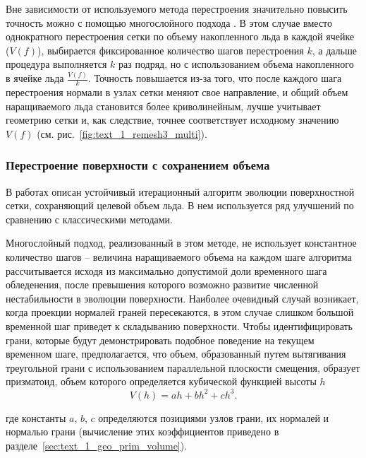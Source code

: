 Вне зависимости от используемого метода перестроения значительно повысить точность можно с помощью многослойного подхода \cite{BourgaultCote2017}.
В этом случае вместо однократного перестроения сетки по объему накопленного льда в каждой ячейке ($V(f)$), выбирается фиксированное количество шагов перестроения $k$, а дальше процедура выполняется $k$ раз подряд, но с использованием объема накопленного в ячейке льда $\frac{V(f)}{k}$.
Точность повышается из-за того, что после каждого шага перестроения нормали в узлах сетки меняют свое направление, и общий объем наращиваемого льда становится более криволинейным, лучше учитывает геометрию сетки и, как следствие, точнее соответствует исходному значению $V(f)$ (см. рис.~\ref{fig:text_1_remesh3_multi}).

\subsubsection{Перестроение поверхности с сохранением объема}

В работах \cite{Thompson2013Remesh,Tong2017Remesh} описан устойчивый итерационный алгоритм эволюции поверхностной сетки, сохраняющий целевой объем льда.
В нем используется ряд улучшений по сравнению с классическими методами.

Многослойный подход, реализованный в этом методе, не использует константное количество шагов -- величина наращиваемого объема на каждом шаге алгоритма рассчитывается исходя из максимально допустимой доли временного шага обледенения, после превышения которого возможно развитие численной нестабильности в эволюции поверхности.
Наиболее очевидный случай возникает, когда проекции нормалей граней пересекаются, в этом случае слишком большой временной шаг приведет к складыванию поверхности.
Чтобы идентифицировать грани, которые будут демонстрировать подобное поведение на текущем временном шаге, предполагается, что объем, образованный путем вытягивания треугольной грани с использованием параллельной плоскости смещения, образует призматоид, объем которого определяется кубической функцией высоты $h$
\begin{equation}\label{text_1_remesh_3d_tong1}
V(h)=ah+bh^2+ch^3.
\end{equation}

где константы $a$, $b$, $c$ определяются позициями узлов грани, их нормалей и нормалью грани (вычисление этих коэффициентов приведено в разделе~\ref{sec:text_1_geo_prim_volume}).

